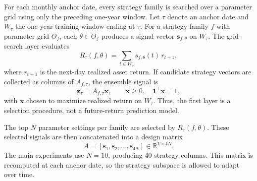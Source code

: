 \documentclass[11pt, letterpaper]{article}
\begin{document}
For each monthly anchor date, every strategy family is searched over a parameter grid using only the preceding one-year window. Let $\tau$ denote an anchor date and $W_\tau$ the one-year training window ending at $\tau$. For a strategy family $f$ with parameter grid $\Theta_f$, each $\theta\in\Theta_f$ produces a signal vector $\mathbf{s}_{f,\theta}$ on $W_\tau$. The grid-search layer evaluates
\[
    R_\tau(f,\theta)
    =
    \sum_{t\in W_\tau} s_{f,\theta}(t)\, r_{t+1},
\]
where $r_{t+1}$ is the next-day realized asset return. If candidate strategy vectors are collected as columns of $A_{f,\tau}$, the ensemble signal is
\[
    \mathbf{z}_{\tau}=A_{f,\tau}\mathbf{x},
    \qquad
    \mathbf{x}\geq 0,\quad \mathbf{1}^{\top}\mathbf{x}=1,
\]
with $\mathbf{x}$ chosen to maximize realized return on $W_\tau$. Thus, the first layer is a selection procedure, not a future-return prediction model.

The top $N$ parameter settings per family are selected by $R_\tau(f,\theta)$. These selected signals are then concatenated into a design matrix
\[
    A = [\mathbf{s}_{1}, \mathbf{s}_{2}, \ldots, \mathbf{s}_{4N}]
    \in \mathbb{R}^{T \times 4N}.
\]
The main experiments use $N=10$, producing 40 strategy columns. This matrix is recomputed at each anchor date, so the strategy subspace is allowed to adapt over time.
\end{document}
